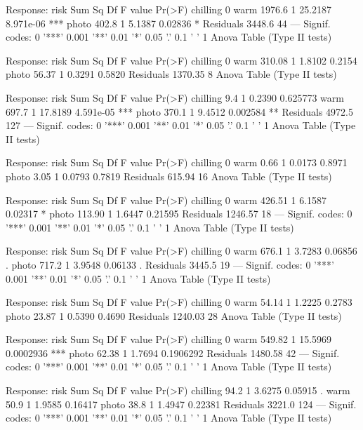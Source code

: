 \documentclass{article}\usepackage[]{graphicx}\usepackage[]{color}
\begin{document}
Response: risk
          Sum Sq Df F value    Pr(>F)    
chilling          0                      
warm      1976.6  1 25.2187 8.971e-06 ***
photo      402.8  1  5.1387   0.02836 *  
Residuals 3448.6 44                      
---
Signif. codes:  0 '***' 0.001 '**' 0.01 '*' 0.05 '.' 0.1 ' ' 1
Anova Table (Type II tests)

Response: risk
           Sum Sq Df F value Pr(>F)
chilling           0               
warm       310.08  1  1.8102 0.2154
photo       56.37  1  0.3291 0.5820
Residuals 1370.35  8               
Anova Table (Type II tests)

Response: risk
          Sum Sq  Df F value    Pr(>F)    
chilling     9.4   1  0.2390  0.625773    
warm       697.7   1 17.8189 4.591e-05 ***
photo      370.1   1  9.4512  0.002584 ** 
Residuals 4972.5 127                      
---
Signif. codes:  0 '***' 0.001 '**' 0.01 '*' 0.05 '.' 0.1 ' ' 1
Anova Table (Type II tests)

Response: risk
          Sum Sq Df F value Pr(>F)
chilling          0               
warm        0.66  1  0.0173 0.8971
photo       3.05  1  0.0793 0.7819
Residuals 615.94 16               
Anova Table (Type II tests)

Response: risk
           Sum Sq Df F value  Pr(>F)  
chilling           0                  
warm       426.51  1  6.1587 0.02317 *
photo      113.90  1  1.6447 0.21595  
Residuals 1246.57 18                  
---
Signif. codes:  0 '***' 0.001 '**' 0.01 '*' 0.05 '.' 0.1 ' ' 1
Anova Table (Type II tests)

Response: risk
          Sum Sq Df F value  Pr(>F)  
chilling          0                  
warm       676.1  1  3.7283 0.06856 .
photo      717.2  1  3.9548 0.06133 .
Residuals 3445.5 19                  
---
Signif. codes:  0 '***' 0.001 '**' 0.01 '*' 0.05 '.' 0.1 ' ' 1
Anova Table (Type II tests)

Response: risk
           Sum Sq Df F value Pr(>F)
chilling           0               
warm        54.14  1  1.2225 0.2783
photo       23.87  1  0.5390 0.4690
Residuals 1240.03 28               
Anova Table (Type II tests)

Response: risk
           Sum Sq Df F value    Pr(>F)    
chilling           0                      
warm       549.82  1 15.5969 0.0002936 ***
photo       62.38  1  1.7694 0.1906292    
Residuals 1480.58 42                      
---
Signif. codes:  0 '***' 0.001 '**' 0.01 '*' 0.05 '.' 0.1 ' ' 1
Anova Table (Type II tests)

Response: risk
          Sum Sq  Df F value  Pr(>F)  
chilling    94.2   1  3.6275 0.05915 .
warm        50.9   1  1.9585 0.16417  
photo       38.8   1  1.4947 0.22381  
Residuals 3221.0 124                  
---
Signif. codes:  0 '***' 0.001 '**' 0.01 '*' 0.05 '.' 0.1 ' ' 1
Anova Table (Type II tests)
\end{document}
